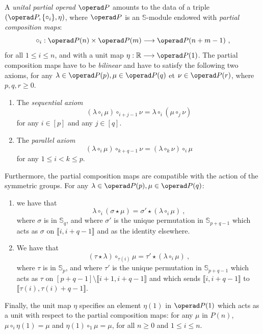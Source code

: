 \documentclass[a4paper,12pt]{amsart}
\begin{document}
\begin{definition}\label{definition: unital partial operad}
A \textit{unital partial operad} $\operad P$ amounts to the data of a triple $(\operad P,\{\circ_i\},\eta)$, where $\operad P$ is an $\mathbb{S}$-module endowed with \textit{partial composition maps}:
\[
\circ_i: \operad P(n) \times \operad P(m) \longrightarrow \operad P(n+m-1)~,
\]
for all $1 \leq i \leq n$, and with a unit map $\eta: \mathbb{R} \longrightarrow \operad P(1)$. The partial composition maps have to be \textit{bilinear} and have to satisfy the following two axioms, for any $\lambda \in \operad P(p), \mu \in \operad P(q)$ et $\nu \in \operad P(r)$, where $p,q,r \geq 0$. 

\begin{enumerate}

\medskip

    \item The \textit{sequential axiom} 
    \[
    (\lambda \circ_i \mu) \circ_{i+j-1} \nu = \lambda \circ_i (\mu \circ_j \nu)
    \]
    for any $i \in [p]$ and any $j \in [q]$.

    \medskip

    \item The \textit{parallel axiom}
    \[
    (\lambda \circ_i \mu) \circ_{k+q-1} \nu = (\lambda \circ_k \nu) \circ_i \mu
    \]
    for any $1 \leq i < k \leq p$.
\end{enumerate}

\medskip 

Furthermore, the partial composition maps are compatible with the action of the symmetric groups. For any $\lambda \in \operad P(p), \mu \in \operad P(q)$:
\begin{enumerate}
\medskip

    \item we have that
    \[
    \lambda \circ_i (\sigma \star \mu) = {\sigma'} \star (\lambda \circ_i \mu)~,
    \]
    where $\sigma$ is in $\mathbb S_q$, and where $\sigma'$ is the unique permutation in $\mathbb S_{p+q-1}$ which acts as $\sigma$ on $\llbracket i, i+q-1 \rrbracket$ and as the identity elsewhere.

\medskip
    \item We have that 
    \[
    (\tau \star \lambda) \circ_{\tau(i)} \mu = \tau' \star (\lambda \circ_i \mu)~,
    \]
    where $\tau$ is in $\mathbb S_p$, and where $\tau'$ is the unique permutation in $\mathbb S_{p + q - 1}$ which acts as $\tau$ on $[p+q-1] \setminus \llbracket i + 1, i + q - 1 \rrbracket$ and which sends $\llbracket i, i + q - 1 \rrbracket$ to $\llbracket \tau(i), \tau(i) + q - 1 \rrbracket$.
\end{enumerate}

\medskip

Finally, the unit map $\eta$ specifies an element $\eta(1)$ in $\operad P(1)$ which acts as a unit with respect to the partial composition maps: for any $\mu$ in $P(n)$, $\mu \circ_i \eta(1) = \mu$ and $\eta(1) \circ_1 \mu = \mu$, for all $n \geq 0$ and $1 \leq i \leq n$. 
\end{definition}
\end{document}
